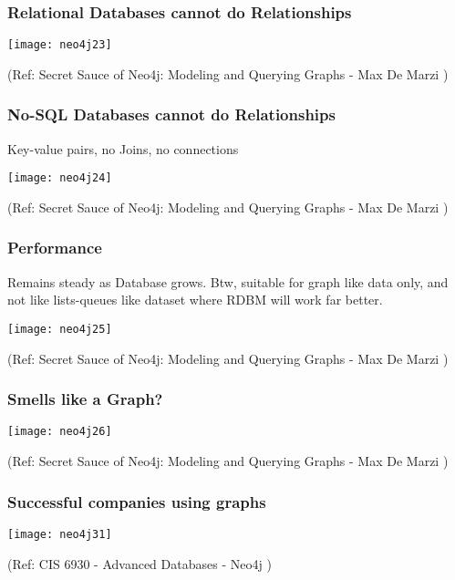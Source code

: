 \begin{frame}[fragile]\frametitle{Relational Databases cannot do Relationships}

\begin{center}
\texttt{[image: neo4j23]}
\end{center}	    

{\tiny (Ref: Secret Sauce of Neo4j: Modeling and Querying Graphs
 - Max De Marzi )}

\end{frame}

\begin{frame}[fragile]\frametitle{No-SQL Databases cannot do Relationships}
Key-value pairs, no Joins, no connections

\begin{center}
\texttt{[image: neo4j24]}
\end{center}	    

{\tiny (Ref: Secret Sauce of Neo4j: Modeling and Querying Graphs
 - Max De Marzi )}

\end{frame}

\begin{frame}[fragile]\frametitle{Performance}
Remains steady as Database grows. Btw, suitable for graph like data only, and not like lists-queues like dataset where RDBM will work far better.

\begin{center}
\texttt{[image: neo4j25]}
\end{center}	    

{\tiny (Ref: Secret Sauce of Neo4j: Modeling and Querying Graphs
 - Max De Marzi )}

\end{frame}

\begin{frame}[fragile]\frametitle{Smells like a Graph?}

\begin{center}
\texttt{[image: neo4j26]}
\end{center}	    

{\tiny (Ref: Secret Sauce of Neo4j: Modeling and Querying Graphs
 - Max De Marzi )}

\end{frame}

\begin{frame}\frametitle{Successful companies using graphs}


\begin{center}
\texttt{[image: neo4j31]}
\end{center}	

{\tiny (Ref: CIS 6930 - Advanced Databases - Neo4j )}
\end{frame}

